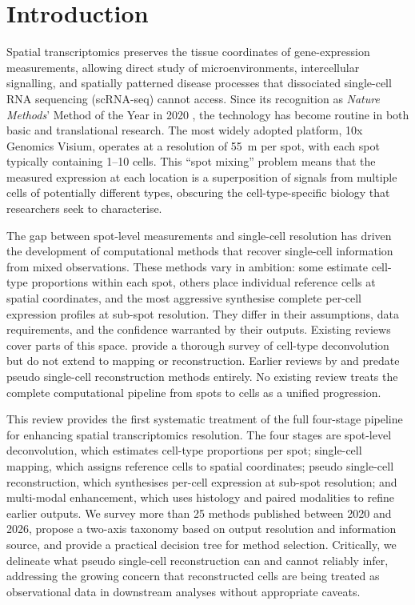 \section{Introduction}
\label{sec:intro}

Spatial transcriptomics preserves the tissue coordinates of gene-expression measurements, allowing direct study of microenvironments, intercellular signalling, and spatially patterned disease processes that dissociated single-cell RNA sequencing (scRNA-seq) cannot access. Since its recognition as \emph{Nature Methods}' Method of the Year in 2020 \citep{marx2021method}, the technology has become routine in both basic and translational research. The most widely adopted platform, 10x Genomics Visium, operates at a resolution of 55~\textmu m per spot, with each spot typically containing 1--10 cells. This ``spot mixing'' problem means that the measured expression at each location is a superposition of signals from multiple cells of potentially different types, obscuring the cell-type-specific biology that researchers seek to characterise.

The gap between spot-level measurements and single-cell resolution has driven the development of computational methods that recover single-cell information from mixed observations. These methods vary in ambition: some estimate cell-type proportions within each spot, others place individual reference cells at spatial coordinates, and the most aggressive synthesise complete per-cell expression profiles at sub-spot resolution. They differ in their assumptions, data requirements, and the confidence warranted by their outputs. Existing reviews cover parts of this space. \citet{gaspardboulinc2025deconvolution} provide a thorough survey of cell-type deconvolution but do not extend to mapping or reconstruction. Earlier reviews by \citet{longo2021integrating} and \citet{tian2023expanding} predate pseudo single-cell reconstruction methods entirely. No existing review treats the complete computational pipeline from spots to cells as a unified progression.

This review provides the first systematic treatment of the full four-stage pipeline for enhancing spatial transcriptomics resolution. The four stages are spot-level deconvolution, which estimates cell-type proportions per spot; single-cell mapping, which assigns reference cells to spatial coordinates; pseudo single-cell reconstruction, which synthesises per-cell expression at sub-spot resolution; and multi-modal enhancement, which uses histology and paired modalities to refine earlier outputs. We survey more than 25 methods published between 2020 and 2026, propose a two-axis taxonomy based on output resolution and information source, and provide a practical decision tree for method selection. Critically, we delineate what pseudo single-cell reconstruction can and cannot reliably infer, addressing the growing concern that reconstructed cells are being treated as observational data in downstream analyses without appropriate caveats.

